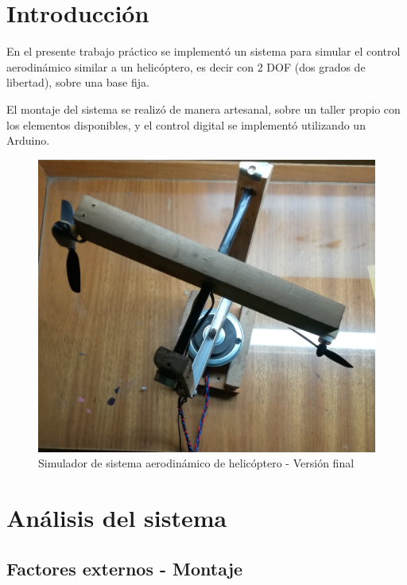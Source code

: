 \documentclass{article}
\begin{document}
\newgeometry{} %




\tableofcontents
\newpage


\section{Introducción}

En el presente trabajo práctico se implementó un sistema para simular el control aerodinámico similar a un helicóptero, es decir con 2 DOF (dos grados de libertad), sobre una base fija.\par
El montaje del sistema se realizó de manera artesanal, sobre un taller propio con los elementos disponibles, y el control digital se implementó utilizando un Arduino.\\

\begin{figure}[H]
\centering
\includegraphics[width=0.7\linewidth]{images/modFinal2.jpg}
\caption{Simulador de sistema aerodinámico de helicóptero - Versión final}
\end{figure}

\newpage

\section{Análisis del sistema}
\subsection{Factores externos - Montaje}
\end{document}
